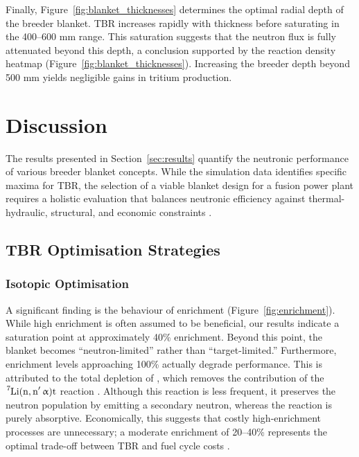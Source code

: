 \documentclass[12pt]{article}
\begin{document}
Finally, Figure~\ref{fig:blanket_thicknesses} determines the optimal radial depth of the breeder
blanket. TBR increases rapidly with thickness before saturating in the 400--600 mm range. This
saturation suggests that the neutron flux is fully attenuated beyond this depth, a conclusion
supported by the reaction density heatmap (Figure~\ref{fig:blanket_thicknesses}). Increasing the
breeder depth beyond 500 mm yields negligible gains in tritium production.



\section{Discussion}
\label{sec:discussion}

The results presented in Section~\ref{sec:results} quantify the neutronic performance of various
breeder blanket concepts. While the simulation data identifies specific maxima for TBR, the
selection of a viable blanket design for a fusion power plant requires a holistic evaluation that
balances neutronic efficiency against thermal-hydraulic, structural, and economic constraints
\cite{hernandez_first_2018, federici_european_2017}.

\subsection{TBR Optimisation Strategies}

\subsubsection{Isotopic Optimisation}

A significant finding is the behaviour of  enrichment (Figure~\ref{fig:enrichment}). While
high enrichment is often assumed to be beneficial, our results indicate a saturation point at
approximately 40\% enrichment. Beyond this point, the blanket becomes ``neutron-limited'' rather
than ``target-limited.'' Furthermore, enrichment levels approaching 100\% actually degrade
performance. This is attributed to the total depletion of , which removes the contribution
of the $\ce{^7Li(n, n^\prime{} \upalpha)t}$ reaction \cite{sawan_physics_2006}. Although this
reaction is less frequent, it preserves the neutron population by emitting a secondary neutron,
whereas the  reaction is purely absorptive. Economically, this suggests that costly
high-enrichment processes are unnecessary; a moderate enrichment of 20--40\% represents the optimal
trade-off between TBR and fuel cycle costs \cite{goel_optimisation_2023,
segantin_optimisation_2020}.
\end{document}
